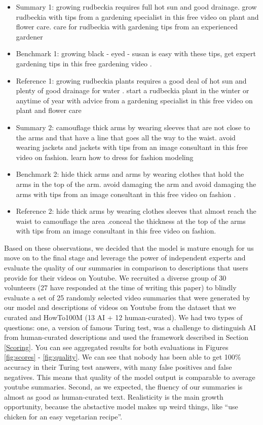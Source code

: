 \documentclass{article}
\begin{document}
\begin{itemize}

\item Summary 1: growing rudbeckia requires full hot sun and good drainage. grow rudbeckia with tips from a gardening specialist in this free video on plant and flower care. care for rudbeckia with gardening tips from an experienced gardener
\item Benchmark 1: growing black - eyed - susan is easy with these tips, get expert gardening tips in this free gardening video .
\item Reference 1: growing rudbeckia plants requires a good deal of hot sun and plenty of good drainage for water . start a rudbeckia plant in the winter or anytime of year with advice from a gardening specialist in this free video on plant and flower care 
 
\item Summary 2: camouflage thick arms by wearing sleeves that are not close to the arms and that have a line that goes all the way to the waist. avoid wearing jackets and jackets with tips from an image consultant in this free video on fashion. learn how to dress for fashion modeling
\item Benchmark 2: hide thick arms and arms by wearing clothes that hold the arms in the top of the arm. avoid damaging the arm and avoid damaging the arms with tips from an image consultant in this free video on fashion .
\item Reference 2: hide thick arms by wearing clothes sleeves that almost reach the waist to camouflage the area .conceal the thickness at the top of the arms with tips from an image consultant in this free video on fashion.

\end{itemize}

Based on these observations, we decided that the model is mature enough for us move on to the final stage and leverage the power of independent experts and evaluate the quality of our summaries in comparison to descriptions that users provide for their videos on Youtube. We recruited a diverse group of 30 volunteers (27 have responded at the time of writing this paper) to blindly evaluate a set of 25 randomly selected video summaries  that were generated by our model and descriptions of videos on Youtube  from the dataset that we curated and HowTo100M (13 AI + 12 human-curated). We had two types of questions: one, a version of famous Turing test, was a challenge to distinguish AI from human-curated descriptions and used the framework described in Section \ref{Scoring}. You can see aggregated results for both evaluations in Figures \ref{fig:scores} - \ref{fig:quality}. We can see that nobody has been able to get 100\% accuracy in their Turing test answers, with many false positives and false negatives. This means that quality of the model output is comparable to average youtube summaries. Second, as we expected, the fluency of our summaries is almost as good as  human-curated text. Realisticity is the main growth opportunity, because the abstactive model makes up weird things, like “use chicken for an easy vegetarian recipe”.
\end{document}
